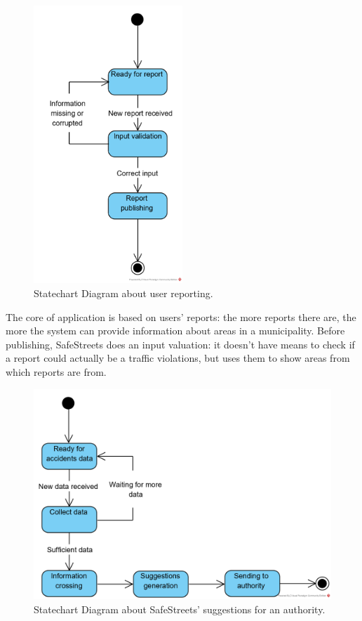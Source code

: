 \documentclass{article}
\begin{document}
			\begin{figure}[H]
				\centering
				\includegraphics[width=0.5\textwidth]{diagrams/statechart_UserSS.png}
				\caption[Statechart Diagram1]{Statechart Diagram about user reporting.}
				\label{fig:statechart_userReporting}
			\end{figure}
			
			The core of application is based on users' reports: the more reports there are, the more the system can provide information about areas in a municipality. Before publishing, SafeStreets does an input valuation: it doesn't have means to check if a report could actually be a traffic violations, but uses them to show areas from which reports are from.
			
			\begin{figure}[H]
				\centering
				\includegraphics {diagrams/statechart_AuthoritySS.png}
				\caption[Statechart Diagram2]{Statechart Diagram about SafeStreets' suggestions for an authority.}
				\label{fig:statechart_SuggestionsForAuthority}
			\end{figure}
			
\end{document}
